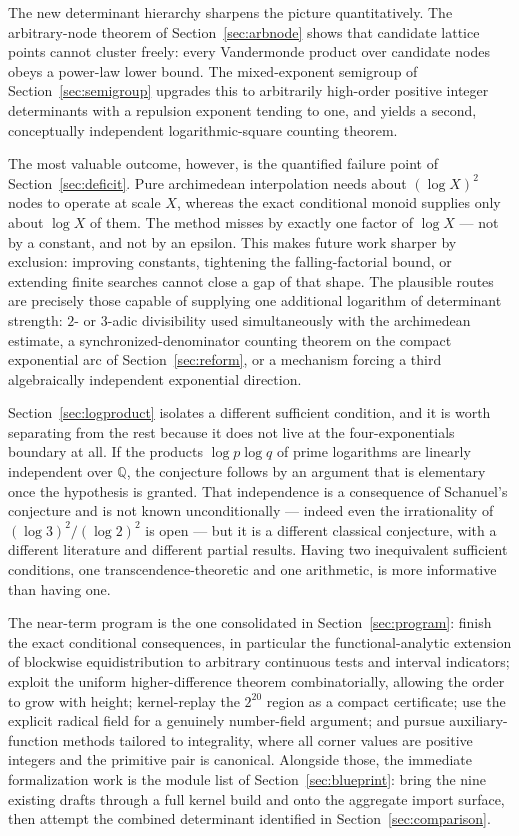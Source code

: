 \documentclass[11pt,oneside]{article}
\theoremstyle{definition}
\theoremstyle{remark}
\newcommand{\Q}{\mathbb Q}
\begin{document}
The new determinant hierarchy sharpens the picture quantitatively.  The arbitrary-node
theorem of Section~\ref{sec:arbnode} shows that candidate lattice points cannot cluster
freely: every Vandermonde product over candidate nodes obeys a power-law lower bound.  The
mixed-exponent semigroup of Section~\ref{sec:semigroup} upgrades this to arbitrarily
high-order positive integer determinants with a repulsion exponent tending to one, and yields
a second, conceptually independent logarithmic-square counting theorem.

The most valuable outcome, however, is the quantified failure point of
Section~\ref{sec:deficit}.  Pure archimedean interpolation needs about $(\log X)^2$ nodes to
operate at scale $X$, whereas the exact conditional monoid supplies only about $\log X$ of
them.  The method misses by exactly one factor of $\log X$ --- not by a constant, and not by
an epsilon.  This makes future work sharper by exclusion: improving constants, tightening the
falling-factorial bound, or extending finite searches cannot close a gap of that shape.  The
plausible routes are precisely those capable of supplying one additional logarithm of
determinant strength: $2$- or $3$-adic divisibility used simultaneously with the archimedean
estimate, a synchronized-denominator counting theorem on the compact exponential arc of
Section~\ref{sec:reform}, or a mechanism forcing a third algebraically independent
exponential direction.

Section~\ref{sec:logproduct} isolates a different sufficient condition, and it is worth
separating from the rest because it does not live at the four-exponentials boundary at all.
If the products $\log p\log q$ of prime logarithms are linearly independent over $\Q$, the
conjecture follows by an argument that is elementary once the hypothesis is granted.  That
independence is a consequence of Schanuel's conjecture and is not known unconditionally ---
indeed even the irrationality of $(\log3)^2/(\log2)^2$ is open --- but it is a different
classical conjecture, with a different literature and different partial results.  Having two
inequivalent sufficient conditions, one transcendence-theoretic and one arithmetic, is more
informative than having one.

The near-term program is the one consolidated in Section~\ref{sec:program}: finish the exact
conditional consequences, in particular the functional-analytic extension of blockwise
equidistribution to arbitrary continuous tests and interval indicators; exploit the uniform
higher-difference theorem combinatorially, allowing the order to grow with height;
kernel-replay the $2^{20}$ region as a compact certificate; use the explicit radical field for
a genuinely number-field argument; and pursue auxiliary-function methods tailored to
integrality, where all corner values are positive integers and the primitive pair is
canonical.  Alongside those, the immediate formalization work is the module list of
Section~\ref{sec:blueprint}: bring the nine existing drafts through a full kernel build and
onto the aggregate import surface, then attempt the combined determinant identified in
Section~\ref{sec:comparison}.
\end{document}
